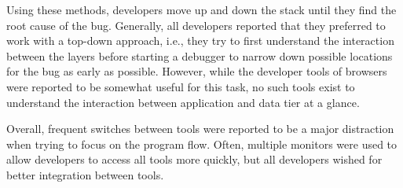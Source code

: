 Using these methods, developers move up and down the stack until they find the root cause of the bug.
Generally, all developers reported that they preferred to work with a top-down approach, i.e., they try to first understand the interaction between the layers before starting a debugger to narrow down possible locations for the bug as early as possible.
However, while the developer tools of browsers were reported to be somewhat useful for this task, no such tools exist to understand the interaction between application and data tier at a glance.

Overall, frequent switches between tools were reported to be a major distraction when trying to focus on the program flow.
Often, multiple monitors were used to allow developers to access all tools more quickly, but all developers wished for better integration between tools.
\tmpEnd

%
%
%



